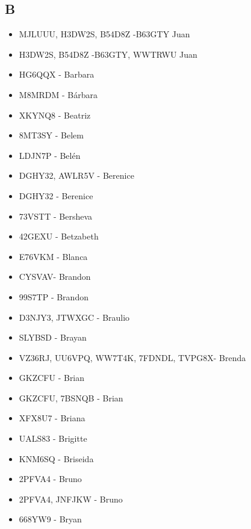 \subsection*{B}
\begin{itemize}[leftmargin=*,nosep]
\item MJLUUU, H3DW2S, B54D8Z -B63GTY Juan
\item H3DW2S, B54D8Z -B63GTY, WWTRWU Juan
\item HG6QQX - Barbara
\item M8MRDM - Bárbara
\item XKYNQ8 - Beatriz
\item 8MT3SY - Belem
\item LDJN7P - Belén
\item DGHY32, AWLR5V - Berenice
\item DGHY32 - Berenice
\item 73VSTT - Bersheva
\item 42GEXU - Betzabeth
\item E76VKM - Blanca
\item CYSVAV- Brandon
\item 99S7TP - Brandon
\item D3NJY3, JTWXGC - Braulio
\item SLYBSD - Brayan
\item VZ36RJ, UU6VPQ, WW7T4K, 7FDNDL, TVPG8X- Brenda
\item GKZCFU - Brian
\item GKZCFU, 7BSNQB - Brian
\item XFX8U7 - Briana
\item UALS83 - Brigitte
\item KNM6SQ - Briseida
\item 2PFVA4 - Bruno
\item 2PFVA4, JNFJKW - Bruno
\item 668YW9 - Bryan
\end{itemize}

